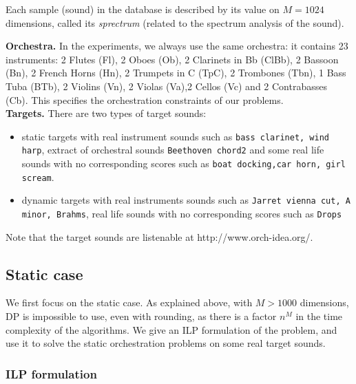 \documentclass[a4paper]{book}
\begin{document}
Each sample (sound) in the database is described by its value on $M=1024$ dimensions, called its {\it sprectrum} (related to the spectrum analysis of the sound). 

{\bf Orchestra.} In the experiments, we always use the same orchestra: it contains 23 instruments: 2 Flutes (Fl), 2 Oboes (Ob), 2 Clarinets in Bb (ClBb), 2 Bassoon (Bn), 2 French Horns (Hn), 2 Trumpets in C (TpC), 2 Trombones (Tbn), 1 Bass Tuba (BTb), 2 Violins (Vn), 2 Violas (Va),2 Cellos (Vc) and 2 Contrabasses (Cb). 
This specifies the orchestration constraints of our problems.\\


{\bf Targets.}
There are two types of target sounds: 
\begin{itemize}
    \item static targets with real instrument sounds such as \texttt{bass clarinet, wind harp}, extract of orchestral sounds \texttt{Beethoven chord2} and some real life sounds with no corresponding scores such as \texttt{boat docking,car horn, girl scream}.
    \item dynamic targets with real instruments sounds such as \texttt{Jarret vienna cut, A minor, Brahms}, real life sounds with no corresponding scores such as \texttt{Drops}
\end{itemize}

Note that the target sounds are listenable at http://www.orch-idea.org/.\\


		
						



\subsection{Static case}\label{sec:expstat}

We first focus on the static case. As explained above, with $M>1000$ dimensions, DP is impossible to use, even with rounding, as there is a factor $n^M$ in the time complexity of the algorithms. We give an ILP formulation of the problem, and use it to solve the static orchestration problems on some real target sounds.

\subsubsection{ILP formulation}
\end{document}

